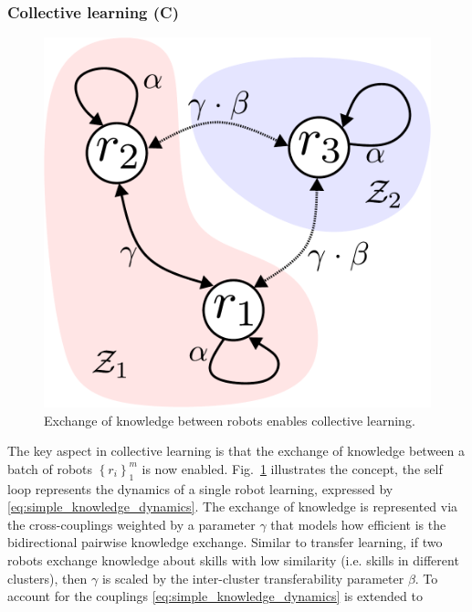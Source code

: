 \subsubsection{\textbf{Collective learning (C)}}
\begin{figure}[!th]
	\centering
	\includegraphics[width=0.7\columnwidth]{fig/cl_example_figure.pdf}
	\caption{Exchange of knowledge between robots enables collective learning.}
	\label{fig:cl_example_figure}
\end{figure}
The key aspect in collective learning is that the exchange of knowledge between a batch of robots $\left \lbrace r_i \right \rbrace^m_{1}$ is now enabled. Fig.~\ref{fig:cl_example_figure} illustrates the concept, the self loop represents the dynamics of a single robot learning, expressed by \eqref{eq:simple_knowledge_dynamics}. The exchange of knowledge is represented via the cross-couplings weighted by a parameter $\gamma$ that models how efficient is the bidirectional pairwise knowledge exchange. Similar to transfer learning, if two robots exchange knowledge about skills with low similarity (i.e. skills in different clusters), then $\gamma$ is scaled by the inter-cluster transferability  parameter $\beta$. To account for the couplings \eqref{eq:simple_knowledge_dynamics} is extended to 


